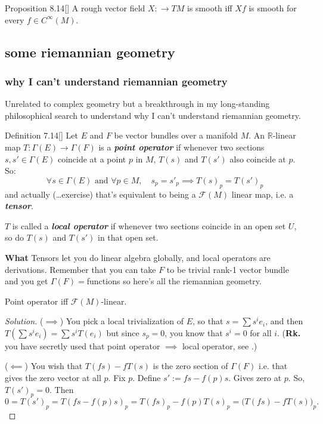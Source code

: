\begin{thing7}{Proposition 8.14}[\cite{les}]\leavevmode
A rough vector field \(X : \to TM\) is smooth iff \(Xf\) is smooth for every \(f\in C^\infty(M)\).
\end{thing7}

\subsection{some riemannian geometry}

\subsubsection{why I can't understand riemannian geometry}

Unrelated to complex geometry but a breakthrough in my long-standing philosophical search to understand why I can't understand riemannian geometry.

\begin{thing4}{Definition 7.14}[\cite{tud}]\label{def:7.14}\leavevmode
Let \(E\) and \(F\) be vector bundles over a manifold \(M\). An \(\mathbb{R}\)-linear map \(T:\Gamma(E)\longrightarrow \Gamma(F)\) is a \textit{\textbf{point operator}} if whenever two sections \(s,s' \in \Gamma(E)\) coincide at a point \(p\) in \(M\), \(T(s)\) and \(T(s')\) also coincide at \(p\). So:
\[\forall s \in \Gamma(E)\text{ and } \forall  p \in M, \quad s_p=s'_p \implies T(s)_p=T(s')_p\]
and actually (…exercise) that's equivalent to being a \(\mathcal{F}(M)\) linear map, i.e. a \textit{\textbf{tensor}}.

\(T\) is called a \textit{\textbf{local operator}} if whenever two sections coincide in an open set \(U\), so do \(T(s)\) and  \(T(s')\) in that open set.

{\color{2}\bfseries What}\hspace{.5em} Tensors let you do linear algebra globally, and local operators are derivations. Remember that you can take \(F\) to be trivial rank-1 vector bundle and you get \(\Gamma(F)=\)functions so here's all the riemannian geometry.
\end{thing4}

\begin{exercise}\leavevmode
Point operator iff \(\mathcal{F}(M)\)-linear.
\end{exercise}

\begin{proof}[Solution]\leavevmode
(\(\implies\)) You pick a local trivialization of \(E\), so that \(s=\sum s^ie_i\), and then
\(T\left(\sum s^ie_i\right)=\sum s^i T(e_i)\) but since \(s_p=0\), you know that \(s^i=0\) for all \(i\). (\textbf{Rk.}  you have secretly used that point operator \(\implies\) local operator, see \cite{tud}.)

(\(\impliedby\)) You wish that \(T(fs)-fT(s)\) is the zero section of  \(\Gamma(F)\) i.e. that gives the zero vector at all \(p\). Fix \(p\). Define \(s':=fs - f(p)s\). Gives zero at \(p\). So, \(T(s')_p=0\). Then
 \[0=T(s')_p=T(fs-f(p)s)_p=T(fs)_p-f(p)T(s)_p=\Big(T(fs)-fT(s)\Big)_p.\]

\end{proof}

